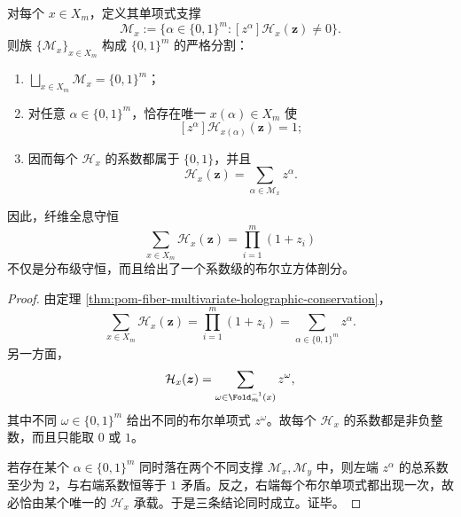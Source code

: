 \begin{theorem}[纤维多变量生成多项式的系数级布尔立方体分割]\label{thm:conclusion-fold-fiber-hologram-boolean-cube-partition}
对每个 \(x\in X_m\)，定义其单项式支撑
\[
\mathcal M_x:=
\{\alpha\in\{0,1\}^m:[z^\alpha]\mathcal H_x(\boldsymbol z)\neq 0\}.
\]
则族 \(\{\mathcal M_x\}_{x\in X_m}\) 构成 \(\{0,1\}^m\) 的严格分割：
\begin{enumerate}
  \item \(\bigsqcup_{x\in X_m}\mathcal M_x=\{0,1\}^m\)；
  \item 对任意 \(\alpha\in\{0,1\}^m\)，恰存在唯一 \(x(\alpha)\in X_m\) 使
  \[
  [z^\alpha]\mathcal H_{x(\alpha)}(\boldsymbol z)=1;
  \]
  \item 因而每个 \(\mathcal H_x\) 的系数都属于 \(\{0,1\}\)，并且
  \[
  \mathcal H_x(\boldsymbol z)=\sum_{\alpha\in \mathcal M_x}z^\alpha.
  \]
\end{enumerate}
因此，纤维全息守恒
\[
\sum_{x\in X_m}\mathcal H_x(\boldsymbol z)=\prod_{i=1}^{m}(1+z_i)
\]
不仅是分布级守恒，而且给出了一个系数级的布尔立方体剖分。
\end{theorem}
\begin{proof}
由定理 \ref{thm:pom-fiber-multivariate-holographic-conservation}，
\[
\sum_{x\in X_m}\mathcal H_x(\boldsymbol z)=\prod_{i=1}^{m}(1+z_i)=\sum_{\alpha\in\{0,1\}^m}z^\alpha.
\]
另一方面，
\[
\mathcal H_x(\boldsymbol z)=\sum_{\omega\in\Fold_m^{-1}(x)}z^\omega,
\]
其中不同 \(\omega\in\{0,1\}^m\) 给出不同的布尔单项式 \(z^\omega\)。故每个 \(\mathcal H_x\) 的系数都是非负整数，而且只能取 \(0\) 或 \(1\)。

若存在某个 \(\alpha\in\{0,1\}^m\) 同时落在两个不同支撑 \(\mathcal M_x,\mathcal M_y\) 中，则左端 \(z^\alpha\) 的总系数至少为 \(2\)，与右端系数恒等于 \(1\) 矛盾。反之，右端每个布尔单项式都出现一次，故必恰由某个唯一的 \(\mathcal H_x\) 承载。于是三条结论同时成立。证毕。
\end{proof}

